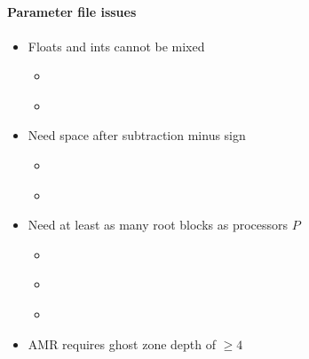 \NEWSEC

\subsection{\ssIssues}

\begin{frame}[fragile,label=ss-issues] 
\secframetitle{\ssIssues}
\framesubtitle{Parameter file issues}

\begin{itemize}
   \item Floats and ints cannot be mixed
   \begin{itemize}
     \item[\frownie] \textcolor{red}{}
     \item[\smiley] \textcolor{green!50!black}{}
   \end{itemize}

   \item Need space after subtraction minus sign
   \begin{itemize}
     \item[\frownie] \textcolor{red}{}
     \item[\smiley] \textcolor{green!50!black}{}
   \end{itemize}
  \item Need at least as many root blocks as processors $P$
  \begin{itemize}
    \item {}
    \item[\frownie] \textcolor{red}{ }
    \item[\smiley]\textcolor{green!50!black}{ }
  \end{itemize}
  \item AMR requires ghost zone depth of $\ge 4$
\end{itemize}


\end{frame}
